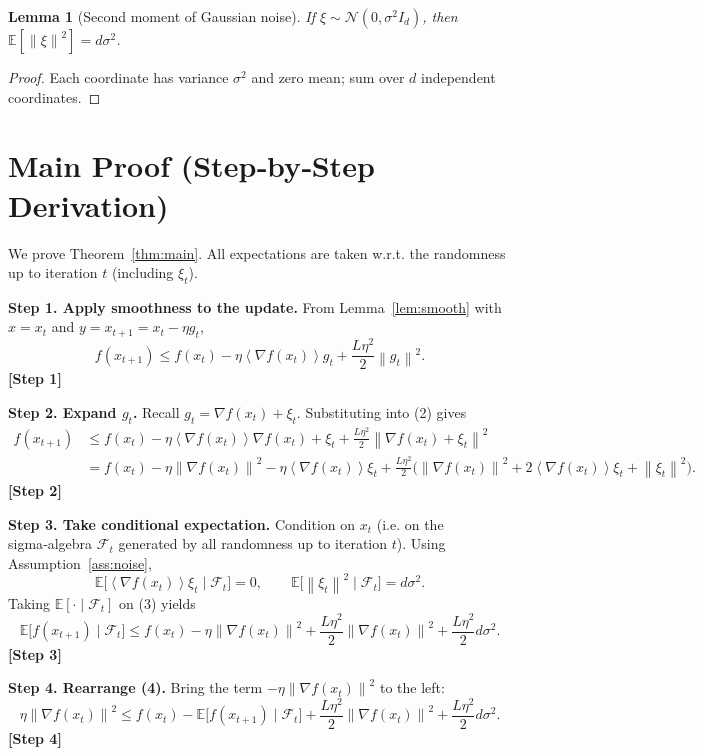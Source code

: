 \documentclass{article}
\newtheorem{lemma}{Lemma}
\newcommand{\E}{\mathbb{E}}
\newcommand{\norm}[1]{\left\|#1\right\|}
\newcommand{\inner}[1]{\left\langle #1 \right\rangle}
\begin{document}
\begin{lemma}[Second moment of Gaussian noise]\label{lem:gauss}
If $\xi\sim\mathcal{N}(0,\sigma^{2}I_{d})$, then $\E[\norm{\xi}^{2}] = d\sigma^{2}$.
\end{lemma}
\begin{proof}
Each coordinate has variance $\sigma^{2}$ and zero mean; sum over $d$ independent coordinates. \qedhere
\end{proof}

\section*{Main Proof (Step‑by‑Step Derivation)}
We prove Theorem~\ref{thm:main}. All expectations are taken w.r.t. the randomness up to iteration $t$ (including $\xi_{t}$).  

\noindent\textbf{Step 1. Apply smoothness to the update.}  
From Lemma~\ref{lem:smooth} with $x=x_{t}$ and $y=x_{t+1}=x_{t}-\eta g_{t}$,
\[
f(x_{t+1})\le f(x_{t})-\eta\inner{\nabla f(x_{t})}{g_{t}}
               +\frac{L\eta^{2}}{2}\norm{g_{t}}^{2}.
\tag{2}
\]
\textbf{[Step 1]}

\noindent\textbf{Step 2. Expand $g_{t}$.}  
Recall $g_{t}= \nabla f(x_{t})+\xi_{t}$. Substituting into (2) gives
\[
\begin{aligned}
f(x_{t+1})
&\le f(x_{t})-\eta\inner{\nabla f(x_{t})}{\nabla f(x_{t})+\xi_{t}}
   +\frac{L\eta^{2}}{2}\norm{\nabla f(x_{t})+\xi_{t}}^{2}\\
&= f(x_{t})-\eta\norm{\nabla f(x_{t})}^{2}
   -\eta\inner{\nabla f(x_{t})}{\xi_{t}}
   +\frac{L\eta^{2}}{2}\Big(\norm{\nabla f(x_{t})}^{2}
          +2\inner{\nabla f(x_{t})}{\xi_{t}}
          +\norm{\xi_{t}}^{2}\Big).
\end{aligned}
\tag{3}
\]
\textbf{[Step 2]}

\noindent\textbf{Step 3. Take conditional expectation.}  
Condition on $x_{t}$ (i.e. on the sigma‑algebra $\mathcal{F}_{t}$ generated by all randomness up to iteration $t$). Using Assumption~\ref{ass:noise},
\[
\E\!\big[\inner{\nabla f(x_{t})}{\xi_{t}}\mid\mathcal{F}_{t}\big]=0,
\qquad
\E\!\big[\norm{\xi_{t}}^{2}\mid\mathcal{F}_{t}\big]=d\sigma^{2}.
\]
Taking $\E[\cdot\mid\mathcal{F}_{t}]$ on (3) yields
\[
\E\!\big[f(x_{t+1})\mid\mathcal{F}_{t}\big]
\le f(x_{t})-\eta\norm{\nabla f(x_{t})}^{2}
   +\frac{L\eta^{2}}{2}\norm{\nabla f(x_{t})}^{2}
   +\frac{L\eta^{2}}{2}d\sigma^{2}.
\tag{4}
\]
\textbf{[Step 3]}

\noindent\textbf{Step 4. Rearrange (4).}  
Bring the term $-\eta\norm{\nabla f(x_{t})}^{2}$ to the left:
\[
\eta\norm{\nabla f(x_{t})}^{2}
\le f(x_{t})-\E\!\big[f(x_{t+1})\mid\mathcal{F}_{t}\big]
   +\frac{L\eta^{2}}{2}\norm{\nabla f(x_{t})}^{2}
   +\frac{L\eta^{2}}{2}d\sigma^{2}.
\tag{5}
\]
\textbf{[Step 4]}
\end{document}
